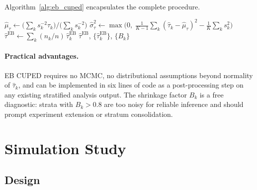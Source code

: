 \documentclass[12pt]{article}
\theoremstyle{plain}
\theoremstyle{definition}
\begin{document}
Algorithm~\ref{alg:eb_cuped} encapsulates the complete procedure.

\begin{algorithm}[H]
\caption{Empirical Bayes CUPED (closed-form)}
\label{alg:eb_cuped}
\BlankLine
{}
$\hat{\mu}_\tau \leftarrow \bigl(\sum_k s_k^{-2}\hat{\tau}_k\bigr)
  \big/ \bigl(\sum_k s_k^{-2}\bigr)$
$\hat{\sigma}^2_\tau \leftarrow \max\!\bigl(0,\;
  \frac{1}{K-1}\sum_k(\hat{\tau}_k-\hat{\mu}_\tau)^2
  - \frac{1}{K}\sum_k s_k^2\bigr)$
$\hat{\tau}^{\mathrm{EB}} \leftarrow \sum_k (n_k/n)\,\hat{\tau}_k^{\mathrm{EB}}$\;
\Return $\hat{\tau}^{\mathrm{EB}}$, $\{\hat{\tau}_k^{\mathrm{EB}}\}$, $\{B_k\}$
\end{algorithm}

\paragraph{Practical advantages.}
EB CUPED requires no MCMC, no distributional assumptions beyond normality of
$\hat{\tau}_k$, and can be implemented in six lines of code as a
post-processing step on any existing stratified analysis output.
The shrinkage factor $B_k$ is a free diagnostic: strata with $B_k > 0.8$
are too noisy for reliable inference and should prompt experiment extension
or stratum consolidation.

\section{Simulation Study}
\label{sec:simulation}

\subsection{Design}
\end{document}
